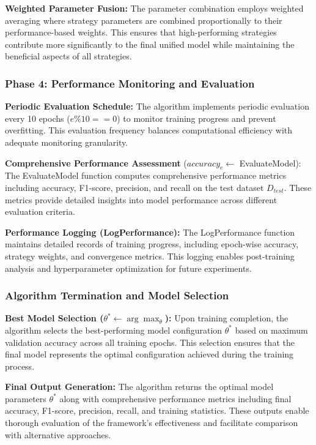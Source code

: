 \documentclass{ieeeaccess}
\begin{document}
\textbf{Weighted Parameter Fusion:} The parameter combination employs weighted averaging where strategy parameters are combined proportionally to their performance-based weights. This ensures that high-performing strategies contribute more significantly to the final unified model while maintaining the beneficial aspects of all strategies.

\subsubsection{Phase 4: Performance Monitoring and Evaluation}

\textbf{Periodic Evaluation Schedule:} The algorithm implements periodic evaluation every 10 epochs ($e \% 10 == 0$) to monitor training progress and prevent overfitting. This evaluation frequency balances computational efficiency with adequate monitoring granularity.

\textbf{Comprehensive Performance Assessment} ($accuracy_e \leftarrow$ EvaluateModel): The EvaluateModel function computes comprehensive performance metrics including accuracy, F1-score, precision, and recall on the test dataset $D_{test}$. These metrics provide detailed insights into model performance across different evaluation criteria.

\textbf{Performance Logging (LogPerformance):} The LogPerformance function maintains detailed records of training progress, including epoch-wise accuracy, strategy weights, and convergence metrics. This logging enables post-training analysis and hyperparameter optimization for future experiments.

\subsubsection{Algorithm Termination and Model Selection}

\textbf{Best Model Selection ($\theta^* \leftarrow \arg\max_\theta$):} Upon training completion, the algorithm selects the best-performing model configuration $\theta^*$ based on maximum validation accuracy across all training epochs. This selection ensures that the final model represents the optimal configuration achieved during the training process.

\textbf{Final Output Generation:} The algorithm returns the optimal model parameters $\theta^*$ along with comprehensive performance metrics including final accuracy, F1-score, precision, recall, and training statistics. These outputs enable thorough evaluation of the framework's effectiveness and facilitate comparison with alternative approaches.
\end{document}
